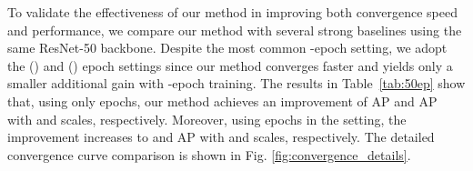 \documentclass[runningheads]{llncs}
\begin{document}
 To validate the effectiveness of our method in improving both convergence speed and performance, we compare our method with several strong baselines using the same ResNet-50 backbone. Despite the most common -epoch setting, we adopt the  () and  () epoch settings since our method converges faster and yields only a smaller additional gain with -epoch training.
The results in Table~\ref{tab:50ep} show that, using only  epochs, our method achieves an improvement of  AP and  AP with  and  scales, respectively. Moreover, using  epochs in the  setting, the improvement increases to  and  AP with  and  scales, respectively. The detailed convergence curve comparison is shown in Fig. \ref{fig:convergence_details}.
\\
\begin{table}[h]
\centering
        \footnotesize
            \renewcommand{\arraystretch}{1.3}
\end{table}
\end{document}
